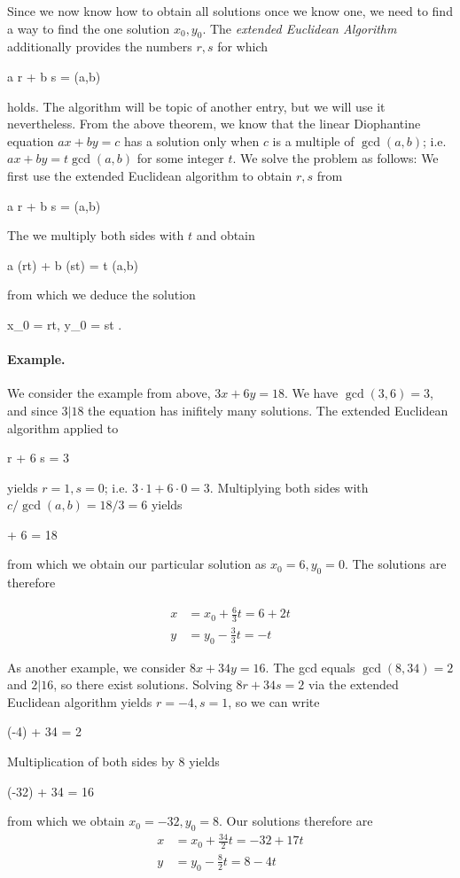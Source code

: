 Since we now know how to obtain all solutions once we know one, we need to find a way to find the one solution $x_0, y_0$. The \emph{extended Euclidean Algorithm} additionally provides the numbers $r, s$ for which

\bee
a r + b s = \gcd(a,b)
\eee

holds. The algorithm will be topic of another entry, but we will use it nevertheless. From the above theorem, we know that the linear Diophantine equation $ax + by = c$ has a solution only when $c$ is a multiple of $\gcd(a,b)$; i.e. $ax + by = t \gcd(a,b)$ for some integer $t$. We solve the problem as follows: We first use the extended Euclidean algorithm to obtain $r, s$ from

\bee
a r + b s = \gcd(a,b)
\eee

The we multiply both sides with $t$ and obtain

\bee
a (rt) + b (st) = t \gcd(a,b)
\eee

from which we deduce the solution

\bee
x_0 = rt, y_0 = st .
\eee

\paragraph{Example.} We consider the example from above, $3x + 6y = 18$. We have $\gcd(3,6) = 3$, and since $3 | 18$ the equation has inifitely many solutions. The extended Euclidean algorithm applied to

 r + 6 s = 3
\eee

yields $r = 1, s = 0$; i.e. $3 \cdot 1 + 6 \cdot 0 = 3$. Multiplying both sides with $c / \gcd(a,b) = 18 / 3 = 6$ yields

   + 6   = 18
\eee

from which we obtain our particular solution as $x_0 = 6, y_0 = 0$. The solutions are therefore

\begin{align*}
  x &= x_0 + \frac{6}{3}t = 6 + 2t \\
  y &= y_0 - \frac{3}{3}t = -t
\end{align*}


As another example, we consider $8x + 34y = 16$. The gcd equals $\gcd(8, 34) = 2$ and $2 | 16$, so there exist solutions. Solving $8r + 34s = 2$ via the extended Euclidean algorithm yields $r = -4, s=1$, so we can write

 \cdot (-4) + 34  = 2
\eee

Multiplication of both sides by $8$ yields

 \cdot(-32) + 34  = 16
\eee

from which we obtain $x_0 = -32, y_0 = 8$. Our solutions therefore are
\begin{align*}
  x &= x_0 + \frac{34}{2}t = -32 + 17t \\
  y &= y_0 - \frac{8}{2}t = 8 - 4t
\end{align*}

